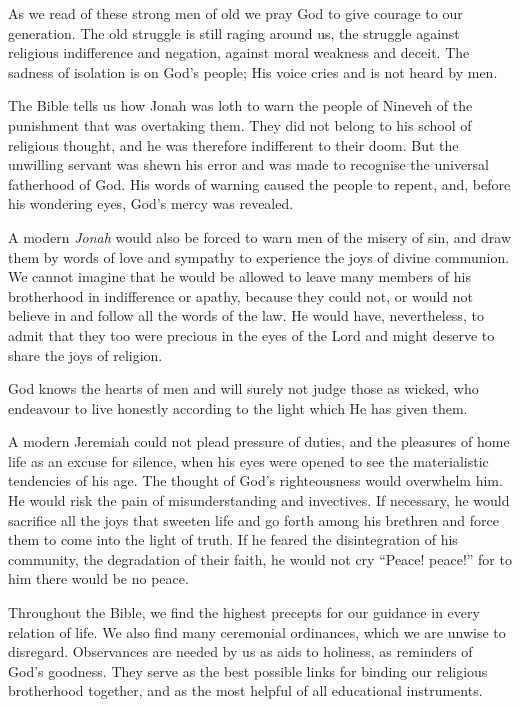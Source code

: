 As we read of these strong men of old
we pray God to give courage to our generation.
The old struggle is still raging around
us, the struggle against religious indifference
and negation, against moral weakness and
deceit. The sadness of isolation is on
God’s people; His voice cries and is not
heard by men.

The Bible tells us how Jonah was loth
to warn the people of Nineveh of the
punishment that was overtaking them.
They did not belong to his school of
religious thought, and he was therefore indifferent
to their doom. But the unwilling
servant was shewn his error and was made
to recognise the universal fatherhood of
God. His words of warning caused the
people to repent, and, before his wondering
eyes, God’s mercy was revealed.

A modern \textsl{Jonah} would also be forced
to warn men of the misery of sin, and draw
them by words of love and sympathy to
experience the joys of divine communion.
We cannot imagine that he would be allowed
to leave many members of his brotherhood
in indifference or apathy, because they could
not, or would not believe in and follow all
the words of the law. He would have,
nevertheless, to admit that they too were
precious in the eyes of the Lord and might
deserve to share the joys of religion.

God knows the hearts of men and will
surely not judge those as wicked, who endeavour
to live honestly according to the
light which He has given them.

A modern Jeremiah could not plead
pressure of duties, and the pleasures of
home life as an excuse for silence, when
his eyes were opened to see the materialistic
tendencies of his age. The thought of God’s
righteousness would overwhelm him. He
would risk the pain of misunderstanding
and invectives. If necessary, he would
sacrifice all the joys that sweeten life and
go forth among his brethren and force
them to come into the light of truth. If
he feared the disintegration of his community,
the degradation of their faith, he
would not cry “Peace! peace!” for to him
there would be no peace.

Throughout the Bible, we find the highest
precepts for our guidance in every relation
of life. We also find many ceremonial
ordinances, which we are unwise to disregard.
Observances are needed by us as
aids to holiness, as reminders of God’s
goodness. They serve as the best possible
links for binding our religious brotherhood
together, and as the most helpful of all
educational instruments.

